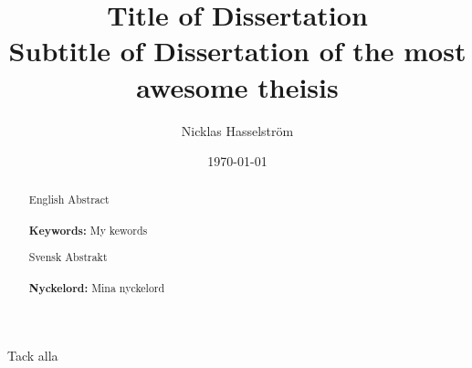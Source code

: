 \documentclass[12pt,twoside]{Classfiles/kau_report}
\title{Title of Dissertation\\ 
\large Subtitle of Dissertation of the most awesome theisis}
\author{Nicklas Hasselstr\"om}
\date{\today}
\begin{document}
\makekautitle
\makeswekautitle

\copyrightpage

\begin{frontmatter}

\approved

\begin{abstract}




English Abstract\cite{test_ref,Hill00systemarchitecture}
\\
\\
\textbf{Keywords:} My kewords


\end{abstract}
\cleardoublepage


\renewcommand{\abstractname}{Abstract (In Swedish)}
\begin{abstract}
Svensk Abstrakt
\\
\\
\textbf{Nyckelord:} Mina nyckelord

\end{abstract}
\cleardoublepage

\begin{acknowledgements}
Tack alla
\end{acknowledgements}
\cleardoublepage

  \tableofcontents
  \cleardoublepage

  \listoffigures
  \cleardoublepage

  \listoftables
  \cleardoublepage
  
  \lstlistoflistings
  \cleardoublepage

\end{frontmatter}
\end{document}
